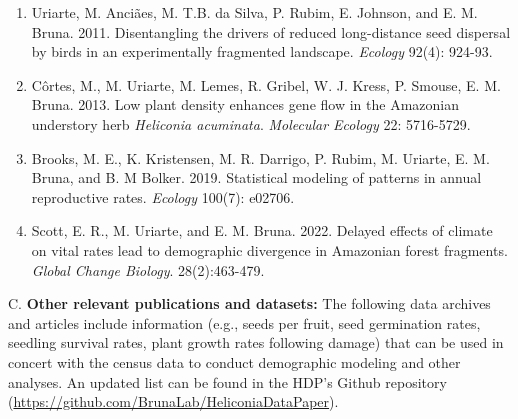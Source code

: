 \documentclass[
  12pt,
  man, donotrepeattitle]{apa6}
\begin{document}
\begin{enumerate}
\item
  Uriarte, M. Anciães, M. T.B. da Silva, P. Rubim, E. Johnson, and E. M. Bruna. 2011. Disentangling the drivers of reduced long-distance seed dispersal by birds in an experimentally fragmented landscape. \emph{Ecology} 92(4): 924-93.
\item
  Côrtes, M., M. Uriarte, M. Lemes, R. Gribel, W. J. Kress, P. Smouse, E. M. Bruna. 2013. Low plant density enhances gene flow in the Amazonian understory herb \emph{Heliconia acuminata}. \emph{Molecular Ecology} 22: 5716-5729.
\item
  Brooks, M. E., K. Kristensen, M. R. Darrigo, P. Rubim, M. Uriarte, E. M. Bruna, and B. M Bolker. 2019. Statistical modeling of patterns in annual reproductive rates. \emph{Ecology} 100(7): e02706.
\item
  Scott, E. R., M. Uriarte, and E. M. Bruna. 2022. Delayed effects of climate on vital rates lead to demographic divergence in Amazonian forest fragments. \emph{Global Change Biology}. 28(2):463-479.
\end{enumerate}

\noindent  
C. \textbf{Other relevant publications and datasets:} The following data archives and articles include information (e.g., seeds per fruit, seed germination rates, seedling survival rates, plant growth rates following damage) that can be used in concert with the census data to conduct demographic modeling and other analyses. An updated list can be found in the HDP's Github repository (\url{https://github.com/BrunaLab/HeliconiaDataPaper}).
\end{document}
